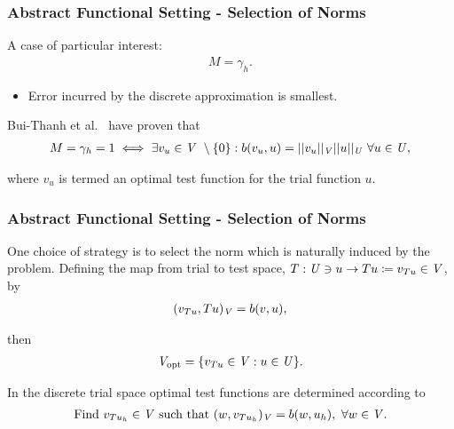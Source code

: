 \begin{frame}
\frametitle{Abstract Functional Setting - Selection of Norms}

A case of particular interest:
\begin{align} \label{eq:equal_m_gamma}
M = \gamma_h.
\end{align}

\begin{itemize}
  \item Error incurred by the discrete approximation is smallest.
\end{itemize}
\vspace{5mm}

Bui-Thanh et al.~\cite[Theorem ]{BuiThanh2013} have proven that
\begin{align} \label{eq:bui_thanh_2-6}
M = \gamma_h = 1
\iff
\exists v_u \in \mathit{{{V}}}\ \setminus \{0\} :
b(v_u,u) = ||v_u||_{\mathit{{{V}}}} ||u||_{\mathit{{{U}}}}\ \forall u \in \mathit{{{U}}},
\end{align}

where $v_u$ is termed an optimal test function for the trial function $u$.

\end{frame}

\begin{frame}
\frametitle{Abstract Functional Setting - Selection of Norms}

One choice of strategy is to select the norm which is naturally induced by the
problem. Defining the map from trial to test space,
$T: \mathit{{{U}}} \ni u \rightarrow Tu \coloneqq v_{Tu} \in \mathit{{{V}}} $, by
\begin{align}
(v_{Tu},Tu)_{\mathit{{{V}}}} = b(v,u),
\end{align}

then
\begin{align} \label{eq:def_discrete_test_space_alt}
\mathit{{{V}}}_\text{opt} = \{ v_{T u} \in \mathit{{{V}}} : u \in \mathit{{{U}}} \}.
\end{align}

In the discrete trial space optimal test functions are determined according to
\begin{align} \label{eq:auxiliary_opt_v}
\text{Find}\ v_{T u_h} \in \mathit{{{V}}}\ \text{such that}\
(w,v_{T u_h})_{\mathit{{{V}}}} = b(w,u_h),\ \forall w \in \mathit{{{V}}}.
\end{align}

\end{frame}

